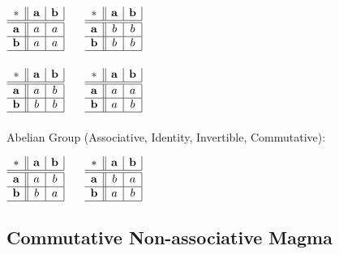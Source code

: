 $\begin{array}{c||c|c|}
  * & \mathbf{a} & \mathbf{b} \\ \hline \hline
  \mathbf{a} & a & a \\ \hline
  \mathbf{b} & a & a \\ \hline
\end{array}$ $\quad$ $\begin{array}{c||c|c|}
  * & \mathbf{a} & \mathbf{b} \\ \hline \hline
  \mathbf{a} & b & b \\ \hline
  \mathbf{b} & b & b \\ \hline
\end{array}$ \\ \hfill \\

$\begin{array}{c||c|c|}
  * & \mathbf{a} & \mathbf{b} \\ \hline \hline
  \mathbf{a} & a & b \\ \hline
  \mathbf{b} & b & b \\ \hline
\end{array}$ $\quad$ $\begin{array}{c||c|c|}
  * & \mathbf{a} & \mathbf{b} \\ \hline \hline
  \mathbf{a} & a & a \\ \hline
  \mathbf{b} & a & b \\ \hline
\end{array}$
\\ \\
Abelian Group (Associative, Identity, Invertible, Commutative):

$\begin{array}{c||c|c|}
  * & \mathbf{a} & \mathbf{b} \\ \hline \hline
  \mathbf{a} & a & b \\ \hline
  \mathbf{b} & b & a \\ \hline
\end{array}$ $\quad$ $\begin{array}{c||c|c|}
  * & \mathbf{a} & \mathbf{b} \\ \hline \hline
  \mathbf{a} & b & a \\ \hline
  \mathbf{b} & a & b \\ \hline
\end{array}$



\subsection{Commutative Non-associative Magma}
\label{sec:commutative_magma}

